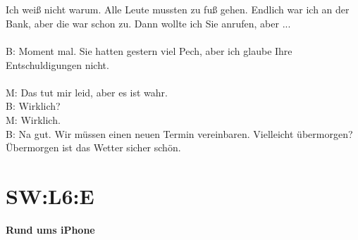 \\
\\
\noindent
Ich weiß nicht warum. Alle Leute mussten zu fuß gehen. Endlich war ich an der Bank, aber die war schon zu.  Dann wollte ich Sie anrufen, aber ...  \\
\\
\noindent
B: Moment mal. Sie hatten gestern viel Pech,  aber ich glaube Ihre Entschuldigungen nicht. \\
\\
M: Das tut mir leid, aber es ist wahr. \\
B: Wirklich?  \\
M: Wirklich. \\
B: Na gut. Wir müssen einen neuen Termin vereinbaren. Vielleicht übermorgen? Übermorgen ist das Wetter sicher schön.  \\

\section{SW:L6:E}
\textbf{Rund ums iPhone}  \\
\\
\\
\\
\\
\noindent

